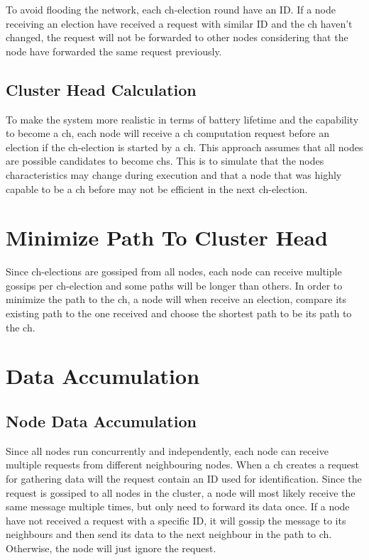 \documentclass[USenglish]{uit-thesis}
\begin{document}
To avoid flooding the network, each \gls{ch}-election round have an ID. If a node receiving an election have received a request with similar ID and the \gls{ch} haven't changed, the request will not be forwarded to other nodes considering that the node have forwarded the same request previously.

\subsection{Cluster Head Calculation}
To make the system more realistic in terms of battery lifetime and the capability to become a \gls{ch}, each node will receive a \gls{ch} computation request before an election if the \gls{ch}-election is started by a \gls{ch}. This approach assumes that all nodes are possible candidates to become \glspl{ch}. This is to simulate that the nodes characteristics may change during execution and that a node that was highly capable to be a \gls{ch} before may not be efficient in the next \gls{ch}-election.


\section{Minimize Path To Cluster Head}
Since \gls{ch}-elections are gossiped from all nodes, each node can receive multiple gossips per \gls{ch}-election and some paths will be longer than others. In order to minimize the path to the \gls{ch}, a node will when receive an election, compare its existing path to the one received \cite{dijkstra} and choose the shortest path to be its path to the \gls{ch}.





\section{Data Accumulation}


\subsection{Node Data Accumulation}
Since all nodes run concurrently and independently, each node can receive multiple requests from different neighbouring nodes. When a \gls{ch} creates a request for gathering data will the request contain an ID used for identification. Since the request is gossiped to all nodes in the cluster, a node will most likely receive the same message multiple times, but only need to forward its data once. If a node have not received a request with a specific ID, it will gossip the message to its neighbours and then send its data to the next neighbour in the path to \gls{ch}. Otherwise, the node will just ignore the request.
\end{document}
